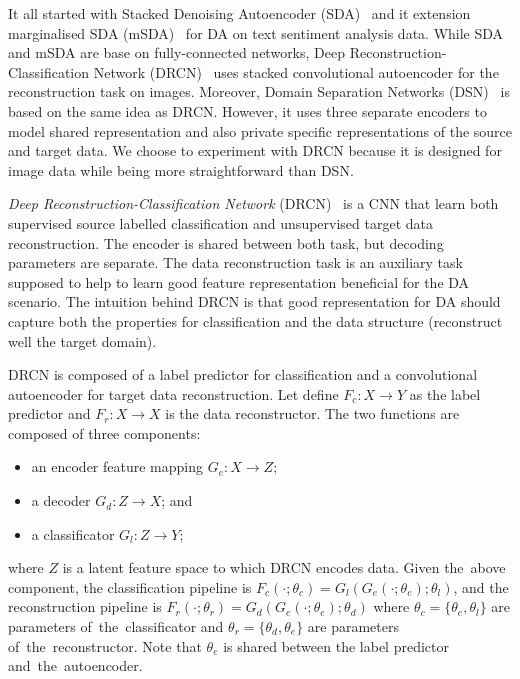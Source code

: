 It all started with Stacked Denoising Autoencoder (SDA)~\cite{glorot2011}
and it extension marginalised SDA (mSDA)~\cite{chen2012} for DA on text sentiment analysis data.
While SDA and mSDA are base on fully-connected networks,
Deep Reconstruction-Classification Network (DRCN)~\cite{ghifary2016}
uses stacked convolutional autoencoder for the reconstruction task on images.
Moreover, Domain Separation Networks (DSN)~\cite{bousmalis2016} is based on the same idea as DRCN.
However, it uses three separate encoders to model shared representation
and also private specific representations of the source and target data.
We choose to experiment with DRCN
because it is designed for image data while being more straightforward than DSN.

\textit{Deep Reconstruction-Classification Network} (DRCN)~\cite{ghifary2016} is a CNN that learn both supervised source labelled classification and unsupervised target data reconstruction.
The encoder is shared between both task, but decoding parameters are separate.
The data reconstruction task is an auxiliary task supposed to help to learn good feature representation beneficial for the DA scenario.
The intuition behind DRCN is
that good representation for DA should capture both the properties for classification and the data structure
(reconstruct well the target domain).

DRCN is composed of a label predictor for classification
and a convolutional autoencoder for target data reconstruction.
Let define \(F_c: X \to Y\) as the label predictor
and \(F_r: X \to X\) is the data reconstructor.
The two functions are composed of three components:

\begin{itemize}
	\item an encoder feature mapping \(G_e: X \to Z\);
	\item a decoder \(G_d: Z \to X\); and
	\item a classificator \(G_l: Z \to Y\);
\end{itemize}

where \(Z\) is a latent feature space to which DRCN encodes data.
Given the~above component,
the classification pipeline is \(F_c(\cdot; \theta_c) = G_l(G_e(\cdot; \theta_e); \theta_l)\),
and the reconstruction pipeline is \(F_r(\cdot; \theta_r) = G_d(G_e(\cdot; \theta_e); \theta_d)\)
where \(\theta_c = \{\theta_e, \theta_l\}\) are parameters of~the~classificator
and \(\theta_r = \{\theta_d, \theta_e\}\) are parameters of~the~reconstructor.
Note that \(\theta_e\) is shared between the label predictor and~the~autoencoder.

